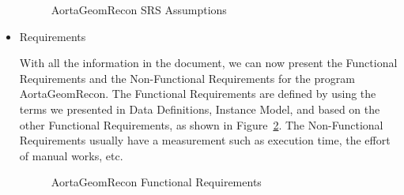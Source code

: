 \begin{itemize}
\begin{figure}[H]
    \centering
    \caption[AortaGeomRecon SRS Assumptions]{AortaGeomRecon SRS Assumptions}
    \label{fig_agr_srs_a}
\end{figure}


\item Requirements

With all the information in the document, we can now present the Functional Requirements and the Non-Functional Requirements for the program AortaGeomRecon. The Functional Requirements are defined by using the terms we presented in Data Definitions, Instance Model, and based on the other Functional Requirements, as shown in Figure~\ref{fig_agr_fr}. The Non-Functional Requirements usually have a measurement such as execution time, the effort of manual works, etc.

\begin{figure}[H]
    \centering
    \caption[AortaGeomRecon Functional Requirements]{AortaGeomRecon Functional Requirements}
    \label{fig_agr_fr}
\end{figure}


\end{itemize}
